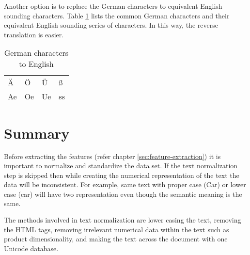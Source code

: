 Another option is to replace the German characters to equivalent English sounding characters. Table \ref{table:deu-eng} lists the common German characters and their equivalent English sounding series of characters. In this way, the reverse translation is easier.
\begin{table}[h]
      \centering
      \caption{German characters to English}
      \label{table:deu-eng}
      \begin{tabular}{ llll }
            \toprule
            \"A& Ö&  Ü&ß \\
            Ae&Oe & Ue&ss\\         
          
            \bottomrule
            \end{tabular}
  \end{table}

\section{Summary}

Before extracting the features (refer chapter \ref{sec:feature-extraction}) it is important to normalize and standardize the data set. If the text normalization step is skipped then while creating the numerical representation of the text the data will be inconsistent. For example, same text with proper case (Car) or lower case (car) will have two representation even though the semantic meaning is the same.  

The methods involved in text normalization are lower casing the text, removing the HTML tags, removing irrelevant numerical data within the text such as product dimensionality, and making the text across the document with one Unicode database.
